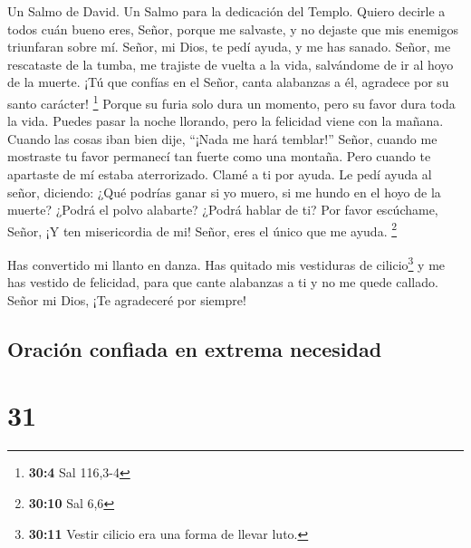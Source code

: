 Un Salmo de David. Un Salmo para la dedicación del Templo.
 Quiero decirle a todos cuán bueno eres, Señor, porque me
salvaste, y no dejaste que mis enemigos triunfaran sobre mí.
 Señor, mi Dios, te pedí ayuda, y me has sanado.
 Señor, me rescataste de la tumba, me trajiste de vuelta a
la vida, salvándome de ir al hoyo de la muerte.  ¡Tú que
confías en el Señor, canta alabanzas a él, agradece por su santo
carácter! \footnote{\textbf{30:4} Sal 116,3-4}  Porque su
furia solo dura un momento, pero su favor dura toda la vida. Puedes
pasar la noche llorando, pero la felicidad viene con la mañana.
 Cuando las cosas iban bien dije, ``¡Nada me hará
temblar!''  Señor, cuando me mostraste tu favor permanecí
tan fuerte como una montaña. Pero cuando te apartaste de mí estaba
aterrorizado.  Clamé a ti por ayuda. Le pedí ayuda al
señor, diciendo:  ¿Qué podrías ganar si yo muero, si me
hundo en el hoyo de la muerte? ¿Podrá el polvo alabarte? ¿Podrá hablar
de ti?  Por favor escúchame, Señor, ¡Y ten misericordia
de mi! Señor, eres el único que me ayuda. \footnote{\textbf{30:10} Sal
  6,6}

 Has convertido mi llanto en danza. Has quitado mis
vestiduras de cilicio\footnote{\textbf{30:11} Vestir cilicio era una
  forma de llevar luto.} y me has vestido de felicidad, 
para que cante alabanzas a ti y no me quede callado. Señor mi Dios, ¡Te
agradeceré por siempre!

\hypertarget{oraciuxf3n-confiada-en-extrema-necesidad}{%
\subsection{Oración confiada en extrema
necesidad}\label{oraciuxf3n-confiada-en-extrema-necesidad}}

\hypertarget{section-30}{%
\section{31}\label{section-30}}

